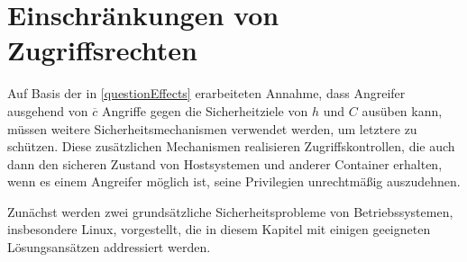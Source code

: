 \documentclass[../main.tex]{subfiles}
\begin{document}






  \section{Einschränkungen von Zugriffsrechten}
		\label{secAccessControls}

		Auf Basis der in \ref{questionEffects} erarbeiteten Annahme, dass Angreifer ausgehend von \(\overline{c}\) Angriffe gegen die Sicherheitziele von \(h\) und \(C\) ausüben kann, müssen weitere Sicherheitsmechanismen verwendet werden, um letztere zu schützen. Diese zusätzlichen Mechanismen realisieren Zugriffskontrollen, die auch dann den sicheren Zustand von Hostsystemen und anderer Container erhalten, wenn es einem Angreifer möglich ist, seine Privilegien unrechtmäßig auszudehnen.

		Zunächst werden zwei grundsätzliche Sicherheitsprobleme von Betriebssystemen, insbesondere Linux, vorgestellt, die in diesem Kapitel mit einigen geeigneten Lösungsansätzen addressiert werden.
\end{document}
